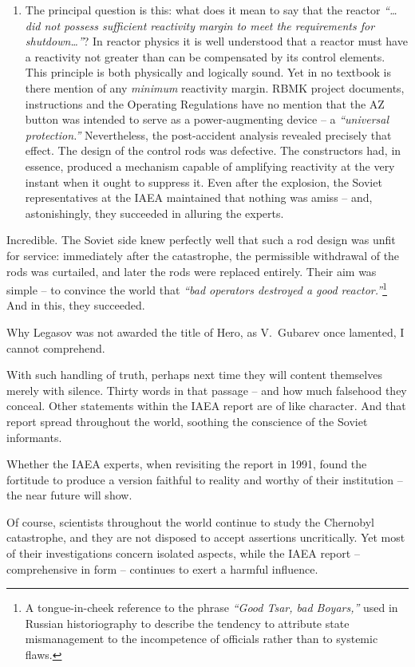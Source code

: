 \documentclass[openright]{bookest}
\begin{document}
\begin{enumerate}
\item The principal question is this: what does it mean to say that the reactor \textit{``\ldots did not possess sufficient reactivity margin to meet the requirements for shutdown\ldots''}? In reactor physics it is well understood that a reactor must have a reactivity not greater than can be compensated by its control elements. This principle is both physically and logically sound. Yet in no textbook is there mention of any \textit{minimum} reactivity margin. RBMK project documents, instructions and the Operating Regulations have no mention that the AZ button was intended to serve as a power-augmenting device -- a \textit{``universal protection.''} Nevertheless, the post-accident analysis revealed precisely that effect. The design of the control rods was defective. The constructors had, in essence, produced a mechanism capable of amplifying reactivity at the very instant when it ought to suppress it. Even after the explosion, the Soviet representatives at the IAEA maintained that nothing was amiss -- and, astonishingly, they succeeded in alluring the experts.
\end{enumerate}

Incredible. The Soviet side knew perfectly well that such a rod design was unfit for service: immediately after the catastrophe, the permissible withdrawal of the rods was curtailed, and later the rods were replaced entirely. Their aim was simple -- to convince the world that \textit{``bad operators destroyed a good reactor.''}\footnote{A tongue-in-cheek reference to the phrase \textit{``Good Tsar, bad Boyars,''} used in Russian historiography to describe the tendency to attribute state mismanagement to the incompetence of officials rather than to systemic flaws.} And in this, they succeeded.

Why Legasov was not awarded the title of Hero, as V.~Gubarev once lamented, I cannot comprehend.

With such handling of truth, perhaps next time they will content themselves merely with silence. Thirty words in that passage -- and how much falsehood they conceal. Other statements within the IAEA report are of like character. And that report spread throughout the world, soothing the conscience of the Soviet informants.

Whether the IAEA experts, when revisiting the report in 1991, found the fortitude to produce a version faithful to reality and worthy of their institution -- the near future will show.

Of course, scientists throughout the world continue to study the Chernobyl catastrophe, and they are not disposed to accept assertions uncritically. Yet most of their investigations concern isolated aspects, while the IAEA report -- comprehensive in form -- continues to exert a harmful influence.
\end{document}

